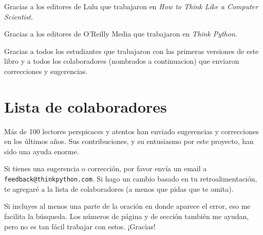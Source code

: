\documentclass[10pt]{book}
\begin{document}
Gracias a los editores de Lulu que trabajaron en
{\em How to Think Like a Computer Scientist}.

Gracias a los editores de O'Reilly Media que trabajaron en
{\em Think Python}.

Gracias a todos los estudiantes que trabajaron con las primeras
versiones de este libro y a todos los colaboradores (nombrados
a continuacion) que enviaron correcciones y sugerencias.


\section*{Lista de colaboradores}

Más de 100 lectores perspicaces y atentos han enviado
sugerencias y correcciones en los últimos años.  Sus
contribuciones, y su entusiasmo por este proyecto, han sido una
ayuda enorme.

Si tienes una sugerencia o corrección, por favor envía un email a
{\tt feedback@thinkpython.com}.  Si hago un cambio basado en tu
retroalimentación, te agregaré a la lista de colaboradores
(a menos que pidas que te omita).

Si incluyes al menos una parte de la oración en donde
aparece el error, eso me facilita la búsqueda.  Los números de página
y de sección también me ayudan, pero no es tan fácil trabajar con estos.
¡Gracias!
\end{document}
